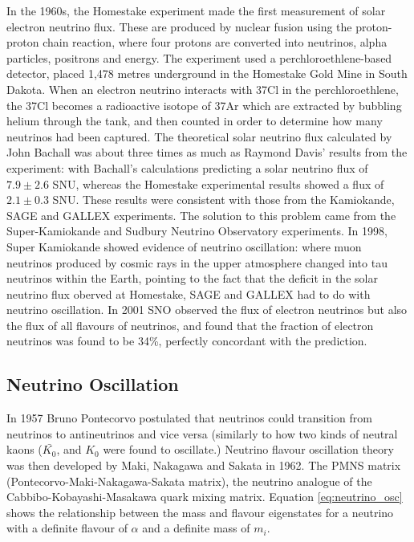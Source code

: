 In the 1960s, the Homestake experiment made the first measurement of solar electron neutrino flux. These are produced by nuclear fusion using the proton-proton chain reaction, where four protons are converted into neutrinos, alpha particles, positrons and energy. The experiment used a perchloroethlene-based detector, placed 1,478 metres underground in the Homestake Gold Mine in South Dakota. When an electron neutrino interacts with 37Cl in the perchloroethlene, the 37Cl becomes a radioactive isotope of 37Ar which are extracted by bubbling helium through the tank, and then counted in order to determine how many neutrinos had been captured. The theoretical solar neutrino flux calculated by John Bachall was about three times as much as Raymond Davis' results from the experiment: with Bachall's calculations predicting a solar neutrino flux of $7.9 \pm 2.6$ SNU, whereas the Homestake experimental results showed a flux of $2.1 \pm 0.3$ SNU. These results were consistent with those from the Kamiokande, SAGE and GALLEX experiments.
\newline
The solution to this problem came from the Super-Kamiokande and Sudbury Neutrino Observatory experiments. In 1998, Super Kamiokande showed evidence of neutrino oscillation: where muon neutrinos produced by cosmic rays in the upper atmosphere changed into tau neutrinos within the Earth, pointing to the fact that the deficit in the solar neutrino flux oberved at Homestake, SAGE and GALLEX had to do with neutrino oscillation. In 2001 SNO observed the flux of electron neutrinos but also the flux of all flavours of neutrinos, and found that the fraction of electron neutrinos was found to be 34\%, perfectly concordant with the prediction.

\subsection{Neutrino Oscillation}
In 1957 Bruno Pontecorvo postulated that neutrinos could transition from neutrinos to antineutrinos and vice versa (similarly to how two kinds of neutral kaons ($\bar{K_{0}}$, and $K_{0}$ were found to oscillate.) Neutrino flavour oscillation theory was then developed by Maki, Nakagawa and Sakata in 1962. The PMNS matrix (Pontecorvo-Maki-Nakagawa-Sakata matrix), the neutrino analogue of the Cabbibo-Kobayashi-Masakawa quark mixing matrix. 
Equation \ref{eq:neutrino_osc} shows the relationship between the mass and flavour eigenstates for a neutrino with a definite flavour of $\alpha$ and a definite mass of $m_{i}$.

